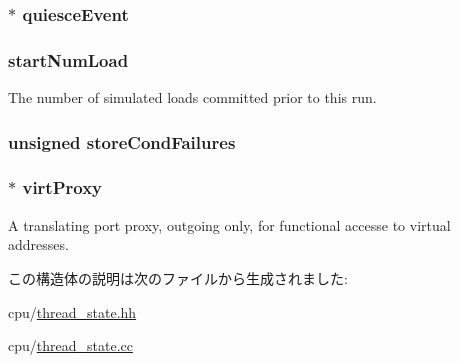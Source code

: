 \label{structThreadState_ac7d5f54aedf1b7a6679e114de0fe6fb4}
\hypertarget{structThreadState_a5845e4af797decd004812fc4e154b3e2}{
\subsubsection[{quiesceEvent}]{$\ast$ {\bf quiesceEvent}}}
\label{structThreadState_a5845e4af797decd004812fc4e154b3e2}
\hypertarget{structThreadState_abc2dac603f413be8cd5f63b5c0b2d48d}{
\subsubsection[{startNumLoad}]{ {\bf startNumLoad}}}
\label{structThreadState_abc2dac603f413be8cd5f63b5c0b2d48d}
The number of simulated loads committed prior to this run. \hypertarget{structThreadState_af112e3f6e9a9305596d19209d67354fb}{
\subsubsection[{storeCondFailures}]{\setlength{\rightskip}{0pt plus 5cm}unsigned {\bf storeCondFailures}}}
\label{structThreadState_af112e3f6e9a9305596d19209d67354fb}
\hypertarget{structThreadState_ab11736157caa6832ca24df48ef3b06db}{
\subsubsection[{virtProxy}]{$\ast$ {\bf virtProxy}}}
\label{structThreadState_ab11736157caa6832ca24df48ef3b06db}
A translating port proxy, outgoing only, for functional accesse to virtual addresses. 

この構造体の説明は次のファイルから生成されました:\begin{DoxyCompactItemize}
\item 
cpu/\hyperlink{thread__state_8hh}{thread\_\-state.hh}\item 
cpu/\hyperlink{thread__state_8cc}{thread\_\-state.cc}\end{DoxyCompactItemize}
